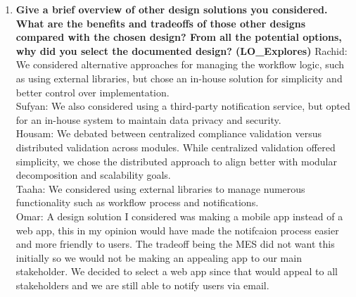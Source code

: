 \documentclass[12pt, titlepage]{article}
\begin{document}
\begin{enumerate}
    \item \textbf{Give a brief overview of other design solutions you considered. What are the benefits and tradeoffs of those other designs compared with the chosen design? From all the potential options, why did you select the documented design? (LO\_Explores)}  
    \newline
    Rachid: We considered alternative approaches for managing the workflow logic, such as using external libraries, but chose an in-house solution for simplicity and better control over implementation. \\
    Sufyan: We also considered using a third-party notification service, but opted for an in-house system to maintain data privacy and security. \\
    Housam: We debated between centralized compliance validation versus distributed validation across modules. While centralized validation offered simplicity, we chose the distributed approach to align better with modular decomposition and scalability goals.\\
    Taaha: We considered using external libraries to manage numerous functionality such as workflow process and notifications. \\
    Omar: A design solution I considered was making a mobile app instead of a web app, this in my opinion would have made the notifcaion process easier and more friendly to users. The tradeoff being the MES did not want this initially so we would not be making an appealing app to our main stakeholder. We decided to select a web app since that would appeal to all stakeholders and we are still able to notify users via email. 
  \end{enumerate}
\end{document}
